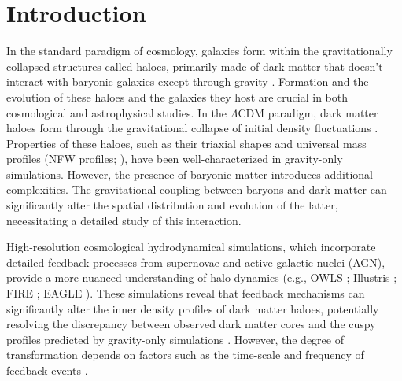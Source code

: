\section{Introduction}
\label{sec:intro}





In the standard paradigm of cosmology, galaxies form within the gravitationally collapsed structures called haloes, primarily made of dark matter that doesn't interact with baryonic galaxies except through gravity \citep[][]{wr78}. Formation and the evolution of these haloes and the galaxies they host are crucial in both cosmological and astrophysical studies. %
In the $\Lambda$CDM paradigm, dark matter haloes form through the gravitational collapse of initial density fluctuations \citep{1974ApJ...187..425P,2002PhR...372....1C}. Properties of these haloes, such as their triaxial shapes \citep{1988ApJ...327..507F} and universal mass profiles (NFW profiles; \citep{1996ApJ...462..563N,1997ApJ...490..493N}), have been well-characterized in gravity-only simulations. However, the presence of baryonic matter introduces additional complexities. The gravitational coupling between baryons and dark matter can significantly alter the spatial distribution and evolution of the latter, necessitating a detailed study of this interaction. 

High-resolution cosmological hydrodynamical simulations, which incorporate detailed feedback processes from supernovae and active galactic nuclei (AGN), provide a more nuanced understanding of halo dynamics (e.g., OWLS \citep{2010MNRAS.402.1536S}; Illustris \citealp{2014MNRAS.445..175G}; FIRE \citep{2014MNRAS.445..581H}; EAGLE \citep{2015MNRAS.446..521S}). These simulations reveal that feedback mechanisms can significantly alter the inner density profiles of dark matter haloes, potentially resolving the discrepancy between observed dark matter cores and the cuspy profiles predicted by gravity-only simulations \citep{2014Natur.506..171P}. However, the degree of transformation depends on factors such as the time-scale and frequency of feedback events \citep{2012MNRAS.421.3464P,2014ApJ...793...46O}.

